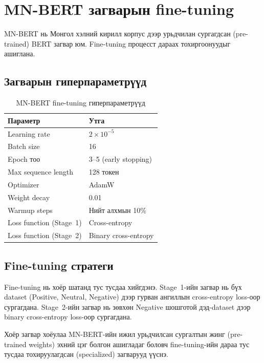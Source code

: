 \section{MN-BERT загварын fine-tuning}

MN-BERT нь Монгол хэлний кирилл корпус дээр урьдчилан сургагдсан (pre-trained)
BERT загвар юм. Fine-tuning процесст дараах тохиргоонуудыг ашиглана.

\subsection{Загварын гиперпараметрүүд}

\begin{table}[H]
\centering
\caption{MN-BERT fine-tuning гиперпараметрүүд}
\label{tab:hyperparams}
\begin{tabular}{@{}ll@{}}
\toprule
\textbf{Параметр} & \textbf{Утга} \\
\midrule
Learning rate             & $2 \times 10^{-5}$ \\
Batch size                & 16 \\
Epoch тоо                 & 3--5 (early stopping) \\
Max sequence length       & 128 токен \\
Optimizer                 & AdamW \\
Weight decay              & 0.01 \\
Warmup steps              & Нийт алхмын 10\% \\
Loss function (Stage~1)   & Cross-entropy \\
Loss function (Stage~2)   & Binary cross-entropy \\
\bottomrule
\end{tabular}
\end{table}

\subsection{Fine-tuning стратеги}

Fine-tuning нь хоёр шатанд тус тусдаа хийгдэнэ. Stage~1-ийн загвар нь бүх
dataset (Positive, Neutral, Negative) дээр гурван ангиллын cross-entropy
loss-оор сургагдана. Stage~2-ийн загвар нь зөвхөн Negative шошготой
дэд-dataset дээр binary cross-entropy loss-оор сургагдана.

Хоёр загвар хоёулаа MN-BERT-ийн ижил урьдчилсан сургалтын жинг (pre-trained
weights) эхний цэг болгон ашигладаг боловч fine-tuning-ийн дараа тус тусдаа
тохируулагдсан (specialized) загварууд үүснэ.

